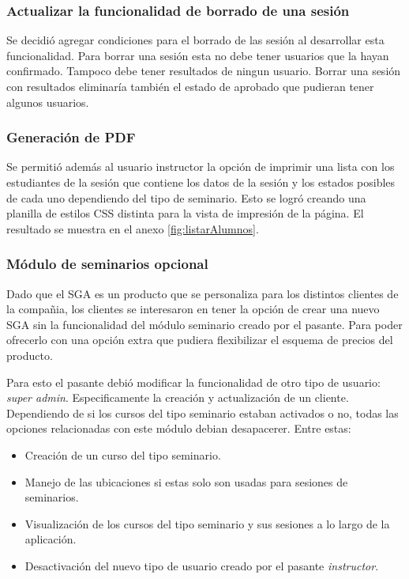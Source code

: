 \subsubsection{Actualizar la funcionalidad de borrado de una sesión}

Se decidió agregar condiciones para el borrado de las sesión al desarrollar esta funcionalidad. Para borrar una sesión esta no debe tener usuarios que la hayan confirmado. Tampoco debe tener resultados de ningun usuario. Borrar una sesión con resultados eliminaría también el estado de aprobado que pudieran tener algunos usuarios.

\subsubsection{Generación de PDF}

Se permitió además al usuario instructor la opción de imprimir una lista con los estudiantes de la sesión que contiene los datos de la sesión y los estados posibles de cada uno dependiendo del tipo de seminario. Esto se logró creando una planilla de estilos CSS distinta para la vista de impresión de la página. El resultado se muestra en el anexo \ref{fig:listarAlumnos}.


\subsubsection{Módulo de seminarios opcional}

Dado que el SGA es un producto que se personaliza para los distintos clientes de la compañia, los clientes se interesaron en tener la opción de crear una nuevo SGA sin la funcionalidad del módulo seminario creado por el pasante. Para poder ofrecerlo con una opción extra que pudiera flexibilizar el esquema de precios del producto.

Para esto el pasante debió modificar la funcionalidad de otro tipo de usuario: \emph{super admin}. Especificamente la creación y actualización de un cliente. Dependiendo de si los cursos del tipo seminario estaban activados o no, todas las opciones relacionadas con este módulo debian desapacerer. Entre estas:

\begin{itemize}
	\item Creación de un curso del tipo seminario.
	\item Manejo de las ubicaciones si estas solo son usadas para sesiones de seminarios.
	\item Visualización de los cursos del tipo seminario y sus sesiones a lo largo de la aplicación.
	\item Desactivación del nuevo tipo de usuario creado por el pasante \emph{instructor}.
\end{itemize}


